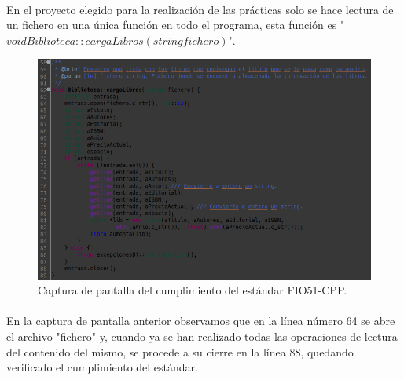 			\paragraph{}En el proyecto elegido para la realización de las prácticas solo se hace lectura de un fichero en una única función en todo el programa, esta función es "$void Biblioteca::cargaLibros(string fichero)$".
			
			\begin{figure}[H]
				\centering
				\includegraphics[scale=0.55]{img/captura1.png}
				\caption{Captura de pantalla del cumplimiento del estándar FIO51-CPP.}
				\label{captura1}
			\end{figure}
		
			\paragraph{}En la captura de pantalla anterior observamos que en la línea número 64 se abre el archivo "fichero" y, cuando ya se han realizado todas las operaciones de lectura del contenido del mismo, se procede a su cierre en la línea 88, quedando verificado el cumplimiento del estándar.

\newpage